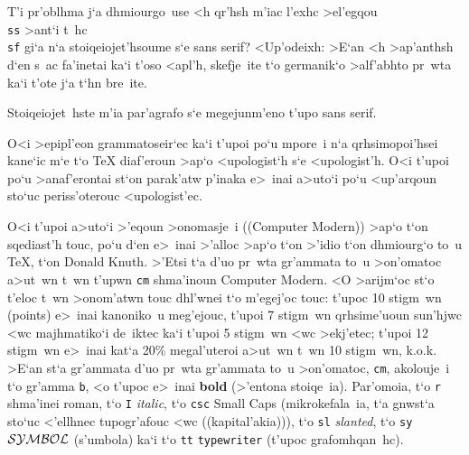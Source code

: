\exercise T'i pr'oblhma j`a dhmiourgo~use <h qr'hsh m'iac l'exhc
>el'egqou {\tt \\ss} >ant`i t~hc {\tt \\sf} gi`a n`a stoiqeiojet'hsoume
s`e {\rm sans serif}? <Up'odeixh: >E`an <h >ap'anthsh d`en s~ac
fa'inetai ka`i t'oso <apl'h, skefje~ite t`o germanik`o >alf'abhto pr~wta
ka`i t'ote j`a t`hn bre~ite.                 

\exercise Stoiqeiojet~hste m'ia par'agrafo s`e megejunm'eno t'upo {\rm
sans serif}.

O<i >epipl'eon grammatoseir`ec ka`i t'upoi po`u mpore~i n`a
qrhsimopoi'hsei kane`ic m`e t`o {\rm \TeX} dia\-f'eroun >ap`o
<upologist`h s`e <upologist'h.  O<i t'upoi po`u >anaf'erontai st`on
parak'atw p'inaka e>~inai a>uto`i po`u <up'arqoun sto`uc periss'oterouc
<upologist'ec. 

\bigskip

O<i t'upoi a>uto`i >'eqoun >onomasje~i (({\rm Computer Modern})) >ap`o
t`on sqediast'h touc, po`u d`en e>~inai >'alloc >ap`o t`on >'idio t`on
dhmiourg`o to~u {\rm \TeX}, t`on {\rm Donald Knuth}.  >'Etsi t`a d'uo
pr~wta gr'ammata to~u >on'omatoc a>ut~wn t~wn t'upwn {\tt cm} shma'inoun
{\rm Computer Modern}.  <O >arijm`oc st`o t'eloc t~wn >onom'atwn touc
dhl'wnei t`o m'egej'oc touc: t'upoc 10 stigm~wn ({\rm points}) e>~inai
kanoniko~u meg'ejouc, t'upoi 7 stigm~wn qrh\-si\-me'uoun sun'hjwc <wc
majhmatiko`i de~iktec ka`i t'upoi 5 stigm~wn <wc >ekj'etec; t'upoi 12
stigm~wn e>~inai kat`a 20\NB \% megal'uteroi a>ut~wn t~wn 10 stigm~wn,
k.o.k. >E`an st`a gr'ammata d'uo pr~wta gr'am\-mata to~u >on'omatoc,
{\tt cm}, akolouje~i t`o gr'amma {\tt b}, <o t'upoc e>~inai {\bf bold}
(>'entona stoiqe~ia).  Par'omoia, t`o {\tt r} shma'inei {\rm roman}, t`o
{\tt I} {\it italic}, t`o {\tt csc} {\sc Small Caps}
(mikro\-kefa\-la~ia, t`a gnwst`a sto`uc <'ellhnec tupogr'afouc <wc
((kapital'akia)){}), t`o {\tt sl} {\sl slanted}, t`o {\tt sy} {$\cal
SYMBOL$} (s'umbola) ka`i t`o {\tt tt} {\tt typewriter} (t'upoc
grafomhqan~hc).

